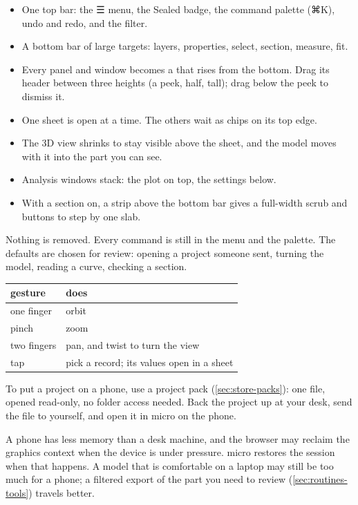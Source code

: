 \begin{itemize}
\item One top bar: the ☰ menu, the Sealed badge, the command palette (⌘K), undo and redo, and the filter.
\item A bottom bar of large targets: layers, properties, select, section, measure, fit.
\item Every panel and window becomes a  that rises from the bottom. Drag its header between three heights (a peek, half, tall); drag below the peek to dismiss it.
\item One sheet is open at a time. The others wait as chips on its top edge.
\item The 3D view shrinks to stay visible above the sheet, and the model moves with it into the part you can see.
\item Analysis windows stack: the plot on top, the settings below.
\item With a section on, a strip above the bottom bar gives a full-width scrub and buttons to step by one slab.
\end{itemize}

Nothing is removed. Every command is still in the menu and the palette. The defaults are chosen for review: opening a project someone sent, turning the model, reading a curve, checking a section.

\begin{tabularx}{\linewidth}{@{}lL@{}}\toprule
gesture & does \\ \midrule
one finger & orbit \\
pinch & zoom \\
two fingers & pan, and twist to turn the view \\
tap & pick a record; its values open in a sheet \\
\bottomrule
\end{tabularx}

\begin{tip}
To put a project on a phone, use a project pack (\cref{sec:store-packs}): one file, opened read-only, no folder access needed. Back the project up  at your desk, send the file to yourself, and open it in micro on the phone.
\end{tip}

A phone has less memory than a desk machine, and the browser may reclaim the graphics context when the device is under pressure. micro restores the session when that happens. A model that is comfortable on a laptop may still be too much for a phone; a filtered export of the part you need to review (\cref{sec:routines-tools}) travels better.

